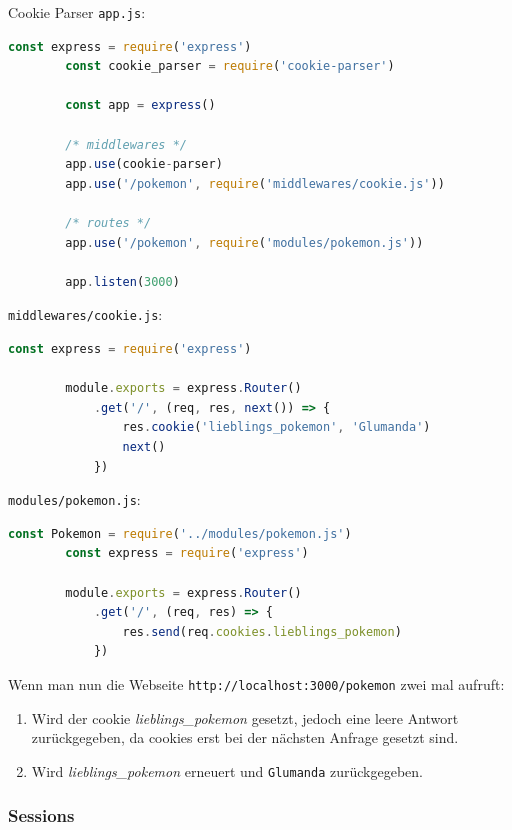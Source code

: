 \begin{example}{Cookie Parser}
    \texttt{app.js}:
    \begin{lstlisting}[language=JavaScript]
        const express = require('express')
        const cookie_parser = require('cookie-parser')

        const app = express()

        /* middlewares */
        app.use(cookie-parser)
        app.use('/pokemon', require('middlewares/cookie.js'))
        
        /* routes */
        app.use('/pokemon', require('modules/pokemon.js'))

        app.listen(3000)
    \end{lstlisting}

    \texttt{middlewares/cookie.js}:
    \begin{lstlisting}[language=JavaScript]
        const express = require('express')
        
        module.exports = express.Router()
            .get('/', (req, res, next()) => {
                res.cookie('lieblings_pokemon', 'Glumanda')
                next()
            })
    \end{lstlisting}

    \texttt{modules/pokemon.js}:
    \begin{lstlisting}[language=JavaScript]
        const Pokemon = require('../modules/pokemon.js')
        const express = require('express')
        
        module.exports = express.Router()
            .get('/', (req, res) => {
                res.send(req.cookies.lieblings_pokemon)
            })
    \end{lstlisting}

    Wenn man nun die Webseite \texttt{http://localhost:3000/pokemon} zwei mal aufruft:
    \begin{enumerate}
        \item Wird der cookie \emph{lieblings\_pokemon} gesetzt, jedoch eine leere Antwort zurückgegeben, da cookies erst bei der nächsten Anfrage gesetzt sind.
        \item Wird \emph{lieblings\_pokemon} erneuert und \texttt{Glumanda} zurückgegeben.
    \end{enumerate}
\end{example}

\subsubsection{Sessions}


